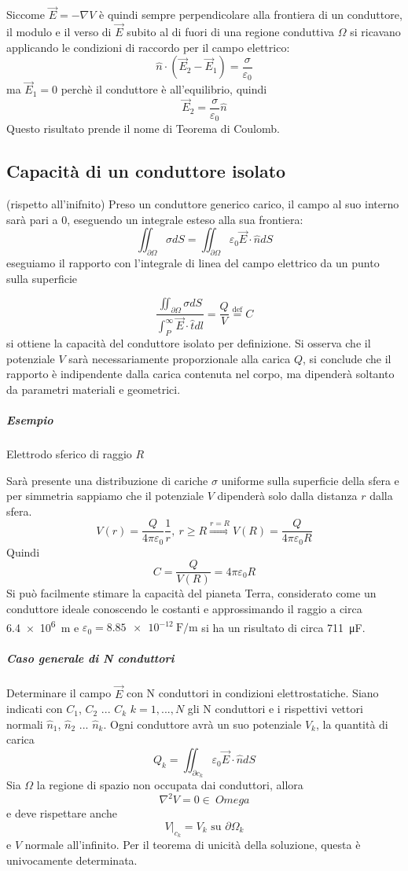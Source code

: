 Siccome $\vec{E} = -\nabla V$ è quindi sempre perpendicolare alla frontiera di un conduttore,
il modulo e il verso di $\vec{E}$ subito al di fuori di una regione conduttiva $\Omega$ 
si ricavano applicando le condizioni di raccordo per il campo elettrico:
$$
\hat{n}\cdot (\vec{E}_2-\vec{E}_1) = \frac{\sigma}{\varepsilon_0}
$$
ma $\vec{E}_1 = 0$ perchè il conduttore è all'equilibrio, quindi 
$$
\vec{E}_2 = \frac{\sigma}{\varepsilon_0} \hat{n}
$$
Questo risultato prende il nome di Teorema di Coulomb.



\subsection{Capacità di un conduttore isolato} (rispetto all'inifnito)
Preso un conduttore generico carico, il campo al suo interno sarà pari a 0, eseguendo un integrale
esteso alla sua frontiera:
$$
\iint_{\partial \Omega}\sigma dS = \iint_{\partial \Omega} \varepsilon_0 \vec{E}\cdot \hat{n} dS
$$
eseguiamo il rapporto con l'integrale di linea del campo elettrico da un punto sulla superficie

$$
\frac{\iint_{\partial \Omega}\sigma dS }{\int_P^\infty \vec{E}\cdot\hat{t}dl } = \frac{Q}{V} \stackrel{\text{def}}{=} C
$$
si ottiene la capacità del conduttore isolato per definizione.
Si osserva che il potenziale $V$ sarà necessariamente proporzionale alla carica $Q$, si 
conclude che il rapporto è indipendente dalla carica contenuta nel corpo, ma dipenderà soltanto da
parametri materiali e geometrici.
\subparagraph{Esempio}
Elettrodo sferico di raggio $R$

Sarà presente una distribuzione di cariche $\sigma$ uniforme sulla superficie della sfera
e per simmetria sappiamo che il potenziale $V$ dipenderà solo dalla distanza $r$ dalla sfera.
$$
V(r) = \frac{Q}{4 \pi \varepsilon_0}\frac{1}{r},\ r\geq R \stackrel{r=R}{\Rightarrow} V(R) = 
\frac{Q}{4\pi\varepsilon_0 R}
$$
Quindi 
$$
C = \frac{Q}{V(R)} = 4\pi\varepsilon_0 R
$$
Si può facilmente stimare la capacità del pianeta Terra, considerato come un conduttore ideale
conoscendo le costanti e approssimando il raggio a circa \SI{6.4e6}{\meter} e $\varepsilon_0 = 
\SI{8.85e-12}{\farad\per\meter}$ si ha un risultato di circa \SI{711}{\micro\farad}.

\subparagraph{Caso generale di N conduttori}
Determinare il campo $\vec{E}$ con N conduttori in condizioni elettrostatiche.
Siano indicati con $C_1$, $C_2$ ... $C_k$ $k=1,...,N$ gli N conduttori e i rispettivi vettori normali
$\hat{n}_1$, $\hat{n}_2$ ... $\hat{n}_k$.
Ogni conduttore avrà un suo potenziale $V_k$, la quantità di carica 
$$
Q_k = \iint_{\partial c_k} \varepsilon_0 \vec{E}\cdot\hat{n} dS
$$
Sia $\Omega$ la regione di spazio non occupata dai conduttori, allora
$$
\nabla^2 V = 0 \in \ Omega 
$$
e deve rispettare anche
$$
\left. V \right|_{c_k} = V_k \text{ su } \partial \Omega_k
$$
e $V$ normale all'infinito.
Per il teorema di unicità della soluzione, questa è univocamente determinata.

